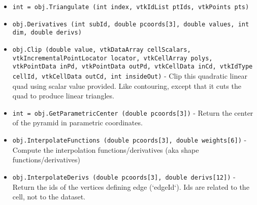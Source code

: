 \begin{itemize}
\item  \verb|int = obj.Triangulate (int index, vtkIdList ptIds, vtkPoints pts)|

\item  \verb|obj.Derivatives (int subId, double pcoords[3], double values, int dim, double derivs)|

\item  \verb|obj.Clip (double value, vtkDataArray cellScalars, vtkIncrementalPointLocator locator, vtkCellArray polys, vtkPointData inPd, vtkPointData outPd, vtkCellData inCd, vtkIdType cellId, vtkCellData outCd, int insideOut)| -  Clip this quadratic linear quad using scalar value provided. Like
 contouring, except that it cuts the quad to produce linear triangles.

\item  \verb|int = obj.GetParametricCenter (double pcoords[3])| -  Return the center of the pyramid in parametric coordinates.

\item  \verb|obj.InterpolateFunctions (double pcoords[3], double weights[6])| -  Compute the interpolation functions/derivatives
 (aka shape functions/derivatives)

\item  \verb|obj.InterpolateDerivs (double pcoords[3], double derivs[12])| -  Return the ids of the vertices defining edge (`edgeId`).
 Ids are related to the cell, not to the dataset.

\end{itemize}
